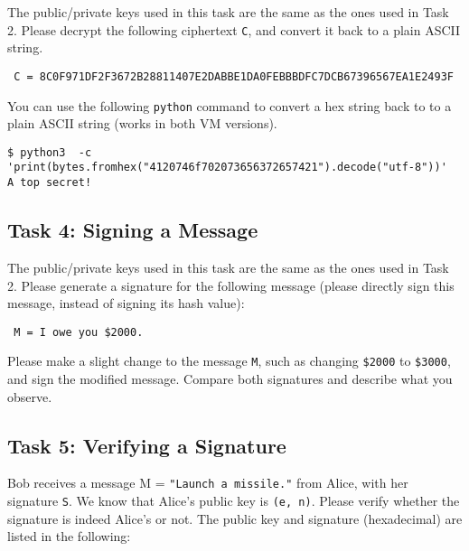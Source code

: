 The public/private keys used in this task are the same as the ones used in Task 2.
Please decrypt the following ciphertext \texttt{C}, and convert it back to
a plain ASCII string.

\begin{lstlisting}
 C = 8C0F971DF2F3672B28811407E2DABBE1DA0FEBBBDFC7DCB67396567EA1E2493F
\end{lstlisting}


You can use the following \texttt{python} command to convert
a hex string back to to a plain ASCII string (works in both VM versions).
\begin{lstlisting}
$ python3  -c 'print(bytes.fromhex("4120746f702073656372657421").decode("utf-8"))'
A top secret!
\end{lstlisting}



\subsection{Task 4: Signing a Message}

The public/private keys used in this task are the same as the ones used in Task 2.
Please generate a signature for the following message (please directly sign this message,
instead of signing its hash value):

\begin{lstlisting}
 M = I owe you $2000.
\end{lstlisting}

Please make a slight change to the message \texttt{M}, such as changing \texttt{\$2000}
to \texttt{\$3000}, and sign the modified message. Compare both signatures and describe what
you observe.


\subsection{Task 5: Verifying a Signature}

Bob receives a message M = \texttt{"Launch a missile."} from
Alice, with her signature \texttt{S}. We know that Alice's public key is \texttt{(e, n)}.
Please verify whether the signature is indeed Alice's or not.
The public key and signature (hexadecimal) are listed in the following:

